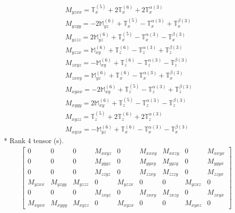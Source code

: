 \documentclass[fleqn,8pt,landscape]{jsarticle}
\begin{document}
\begin{align*}
& M_{yzxx} = \mathbb{T}_{x}^{(5)} + 2 \mathbb{T}_{x}^{(6)} + 2 \mathbb{T}_{x}^{\alpha(3)} \\
& M_{yzyy} = - 2 \mathbb{M}_{yz}^{(6)} + \mathbb{T}_{x}^{(5)} - \mathbb{T}_{x}^{\alpha(3)} + \mathbb{T}_{x}^{\beta(3)} \\
& M_{yzzz} = 2 \mathbb{M}_{yz}^{(6)} + \mathbb{T}_{x}^{(5)} - \mathbb{T}_{x}^{\alpha(3)} - \mathbb{T}_{x}^{\beta(3)} \\
& M_{yzzx} = \mathbb{M}_{xy}^{(6)} + \mathbb{T}_{z}^{(6)} - \mathbb{T}_{z}^{\alpha(3)} + \mathbb{T}_{z}^{\beta(3)} \\
& M_{zxyz} = - \mathbb{M}_{xy}^{(6)} + \mathbb{T}_{z}^{(6)} - \mathbb{T}_{z}^{\alpha(3)} - \mathbb{T}_{z}^{\beta(3)} \\
& M_{zxxy} = \mathbb{M}_{yz}^{(6)} + \mathbb{T}_{x}^{(6)} - \mathbb{T}_{x}^{\alpha(3)} + \mathbb{T}_{x}^{\beta(3)} \\
& M_{xyxx} = - 2 \mathbb{M}_{xy}^{(6)} + \mathbb{T}_{z}^{(5)} - \mathbb{T}_{z}^{\alpha(3)} + \mathbb{T}_{z}^{\beta(3)} \\
& M_{xyyy} = 2 \mathbb{M}_{xy}^{(6)} + \mathbb{T}_{z}^{(5)} - \mathbb{T}_{z}^{\alpha(3)} - \mathbb{T}_{z}^{\beta(3)} \\
& M_{xyzz} = \mathbb{T}_{z}^{(5)} + 2 \mathbb{T}_{z}^{(6)} + 2 \mathbb{T}_{z}^{\alpha(3)} \\
& M_{xyzx} = - \mathbb{M}_{yz}^{(6)} + \mathbb{T}_{x}^{(6)} - \mathbb{T}_{x}^{\alpha(3)} - \mathbb{T}_{x}^{\beta(3)}
\end{align*}
* Rank 4 tensor (s).
\begin{align*}
\begin{bmatrix} 0 & 0 & 0 & M_{xxyz} & 0 & M_{xxxy} & M_{xxzy} & 0 & M_{xxyx} \\ 0 & 0 & 0 & M_{yyyz} & 0 & M_{yyxy} & M_{yyzy} & 0 & M_{yyyx} \\ 0 & 0 & 0 & M_{zzyz} & 0 & M_{zzxy} & M_{zzzy} & 0 & M_{zzyx} \\ M_{yzxx} & M_{yzyy} & M_{yzzz} & 0 & M_{yzzx} & 0 & 0 & M_{yzxz} & 0 \\ 0 & 0 & 0 & M_{zxyz} & 0 & M_{zxxy} & M_{zxzy} & 0 & M_{zxyx} \\ M_{xyxx} & M_{xyyy} & M_{xyzz} & 0 & M_{xyzx} & 0 & 0 & M_{xyxz} & 0 \end{bmatrix}
\end{align*}
\end{document}
